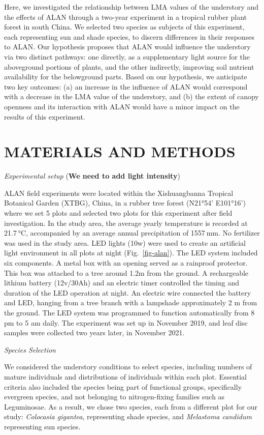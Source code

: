 \documentclass[
  12pt,
  letterpaper,
  DIV=11,
  numbers=noendperiod]{scrartcl}
\begin{document}
Here, we investigated the relationship between LMA values of the
understory and the effects of ALAN through a two-year experiment in a
tropical rubber plant forest in south China. We selected two species as
subjects of this experiment, each representing sun and shade species, to
discern differences in their responses to ALAN. Our hypothesis proposes
that ALAN would influence the understory via two distinct pathways: one
directly, as a supplementary light source for the aboveground portions
of plants, and the other indirectly, improving soil nutrient
availability for the belowground parts. Based on our hypothesis, we
anticipate two key outcomes: (a) an increase in the influence of ALAN
would correspond with a decrease in the LMA value of the understory, and
(b) the extent of canopy openness and its interaction with ALAN would
have a minor impact on the results of this experiment.

\hypertarget{materials-and-methods}{%
\section{MATERIALS AND METHODS}\label{materials-and-methods}}

\emph{Experimental setup} (\textbf{We need to add light intensity})

ALAN field experiments were located within the Xishuangbanna Tropical
Botanical Garden (XTBG), China, in a rubber tree forest (N21°54'
E101°16') where we set 5 plots and selected two plots for this
experiment after field investigation. In the study area, the average
yearly temperature is recorded at 21.7 °C, accompanied by an average
annual precipitation of 1557 mm. No fertilizer was used in the study
area. LED lights (10w) were used to create an artificial light
environment in all plots at night (Fig.~\ref{fig-alan}). The LED system
included six components. A metal box with an opening served as a
rainproof protector. This box was attached to a tree around 1.2m from
the ground. A rechargeable lithium battery (12v/30Ah) and an electric
timer controlled the timing and duration of the LED operation at night.
An electric wire connected the battery and LED, hanging from a tree
branch with a lampshade approximately 2 m from the ground. The LED
system was programmed to function automatically from 8 pm to 5 am daily.
The experiment was set up in November 2019, and leaf disc samples were
collected two years later, in November 2021.

\emph{Species Selection}

We considered the understory conditions to select species, including
numbers of mature individuals and distributions of individuals within
each plot. Essential criteria also included the species being part of
functional groups, specifically evergreen species, and not belonging to
nitrogen-fixing families such as Leguminosae. As a result, we chose two
species, each from a different plot for our study: \emph{Colocasia
gigantea}, representing shade species, and \emph{Melastoma candidum}
representing sun species.
\end{document}
